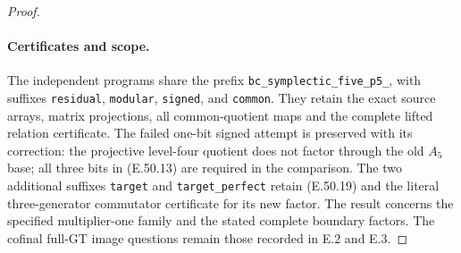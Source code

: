 \begin{proof}
\paragraph{Certificates and scope.}
The independent programs share the prefix
\texttt{bc\_symplectic\_}\allowbreak\texttt{five\_p5\_}, with
suffixes \texttt{residual}, \texttt{modular},
\texttt{signed}, and \texttt{common}.
They retain the exact source arrays,
matrix projections, all common-quotient
maps and the complete lifted relation
certificate.  The failed one-bit signed
attempt is preserved with its correction:
the projective level-four quotient does
not factor through the old $A_5$ base;
all three bits in \textup{(E.50.13)}
are required in the comparison.
The two additional suffixes \texttt{target}
and \texttt{target\_perfect} retain
\textup{(E.50.19)} and the literal three-generator
commutator certificate for its new factor.
The result concerns the specified
multiplier-one family and the stated
complete boundary factors.  The cofinal
full-GT image questions remain those
recorded in E.2 and E.3.
\end{proof}
